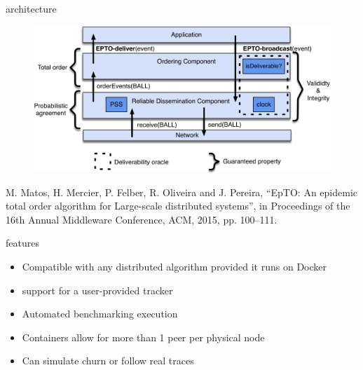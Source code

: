 
\begin{frame}{\epto{} architecture}
    \begin{figure}
        \includegraphics[scale=0.5]{figures/architecture}
    \end{figure}
\tiny{M. Matos, H. Mercier, P. Felber, R. Oliveira and J. Pereira, “EpTO: An epidemic total order algorithm for Large-scale distributed systems”, in Proceedings of the 16th Annual Middleware Conference, ACM, 2015, pp. 100–111.
}
\end{frame}

\begin{frame}{\sys{} features}
    \begin{itemize}
    	\item Compatible with any distributed algorithm provided it runs on Docker
    	\item support for a user-provided tracker
    	\item Automated benchmarking execution
    	\item Containers allow for more than 1 peer per physical node
    	\item Can simulate churn or follow real traces
    \end{itemize}
\end{frame}

